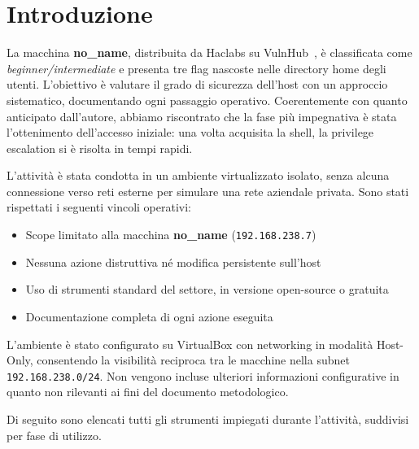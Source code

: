 \documentclass[11pt]{report}
\begin{document}
	\chapter{Introduzione}
	La macchina \textbf{no\_name}, distribuita da Haclabs su VulnHub~\cite{vulnhub}, è classificata come \textit{beginner/intermediate} e presenta tre flag nascoste nelle directory home degli utenti.  L'obiettivo è valutare il grado di sicurezza dell'host con un approccio sistematico, documentando ogni passaggio operativo. Coerentemente con quanto anticipato dall'autore, abbiamo riscontrato che la fase più impegnativa è stata l'ottenimento dell'accesso iniziale: una volta acquisita la shell, la privilege escalation si è risolta in tempi rapidi. 
	
	L'attività è stata condotta in un ambiente virtualizzato isolato, senza alcuna connessione verso reti esterne per simulare una rete aziendale privata. Sono stati rispettati i seguenti vincoli operativi:
	\begin{itemize}[leftmargin=*]
		\item Scope limitato alla macchina \textbf{no\_name} (\texttt{192.168.238.7})
		\item Nessuna azione distruttiva né modifica persistente sull'host
		\item Uso di strumenti standard del settore, in versione open-source o gratuita
		\item Documentazione completa di ogni azione eseguita
	\end{itemize}
	
	L'ambiente è stato configurato su VirtualBox con networking in modalità Host-Only, consentendo la visibilità reciproca tra le macchine nella subnet \texttt{192.168.238.0/24}. Non vengono incluse ulteriori informazioni configurative in quanto non rilevanti ai fini del documento metodologico.
	
	Di seguito sono elencati tutti gli strumenti impiegati durante l'attività, suddivisi per fase di utilizzo.
	
\end{document}
